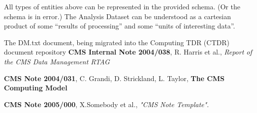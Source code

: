 \documentclass{cmspaper}
\begin{document}
All types of entities above can be represented in the provided schema.  (Or the schema
is in error.)  The Analysis Dataset can be understood as a cartesian product of some
``results of processing'' and some ``units of interesting data''.  


\begin{thebibliography}{9}
   The DM.txt document, being migrated into the Computing
      TDR (CTDR) document repository
   {\bf CMS Internal Note 2004/038}, R. Harris et al., 
    {\it Report of the CMS Data Management RTAG}

   {\bf CMS Note 2004/031}, C. Grandi, D. Strickland,
               L. Taylor, {\bf The CMS Computing Model}

   {\bf CMS Note 2005/000},
    X.Somebody et al.,
    {\em "CMS Note Template"}.
\end{thebibliography}
 
\pagebreak
\end{document}
